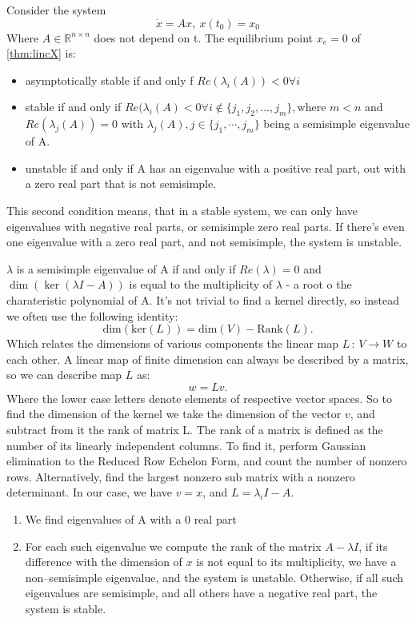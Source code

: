 {
 Consider the system
 \begin{equation}
     \label{thm:lincX}
     \dot{x} = Ax, \: x(t_0) = x_0
 \end{equation}
 Where $A \in \mathbb{R}^{n\times n}$ does not depend on t. The equilibrium point $x_e = 0$ of \ref{thm:lincX} is:
 \begin{itemize}
         \item asymptotically stable if and only f $Re(\lambda_i(A)) < 0 \forall i $ 
         \item stable if and only if $Re(\lambda_i(A) < 0 \forall i \not \in \{j_1, j_2, ..., j_m\}, \text{where } m < n $ and $Re(\lambda_j(A)) = 0$ with  $\lambda_j(A), j \in \{ j_1, \cdots ,j_m\}$ being a semisimple eigenvalue of A. 
         \item unstable if and only if A has an eigenvalue with a positive real part, out with a zero real part that is not semisimple.
         
 \end{itemize}
 \nt
 {
     This second condition means, that in a stable system, we can only have eigenvalues with negative real parts, or semisimple zero real parts. If there's even one eigenvalue with a zero real part, and not semisimple, the system is unstable. 
 }
 {
     $\lambda$ is a semisimple eigenvalue of A if and only if  $Re(\lambda) = 0$ and  $\dim (\ker (\lambda I - A))$ is equal to the multiplicity of  $\lambda$ - a root o the charateristic polynomial of A.
     It's not trivial to find a kernel directly, so instead we often use the following identity:
     \[
         \mathrm{dim}(\mathrm{ker}(L)) =  \mathrm{dim}(V) - \mathrm{Rank}(L)
     .\] 
     Which relates the dimensions of various components the linear map $L\,:\,V \longrightarrow W $ to each other.
 A linear map of finite dimension can always be described by a matrix, so we can describe map $L$ as:
  \[
 w=Lv
 .\] 
 Where the lower case letters denote elements of respective vector spaces.
 So to find the dimension of the kernel we take the dimension of the vector $v$, and subtract from it the rank of matrix L. The rank of a matrix is defined as the number of its linearly independent columns. To find it, perform Gaussian elimination to the Reduced Row Echelon Form, and count the number of nonzero rows. Alternatively, find the largest nonzero sub matrix with a nonzero determinant. In our case, we have $v = x$, and  $L = \lambda_i I - A$.\\
\begin{enumerate}
    \item We find eigenvalues of A with a 0 real part
    \item For each such eigenvalue we compute the rank of the matrix $A-\lambda I$, if its difference with the dimension of $x$ is not equal to its multiplicity, we have a non--semisimple eigenvalue, and the system is unstable. Otherwise, if all such eigenvalues are semisimple, and all others have a negative real part, the system is stable.
\end{enumerate}
 }

 \ex{}
 {}
}


